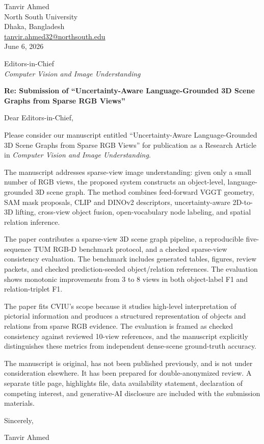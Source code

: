 \documentclass[11pt]{article}
\begin{document}
\begin{flushright}
Tanvir Ahmed\\
North South University\\
Dhaka, Bangladesh\\
\href{mailto:tanvir.ahmed32@northsouth.edu}{tanvir.ahmed32@northsouth.edu}\\
June 6, 2026
\end{flushright}

Editors-in-Chief\\
\emph{Computer Vision and Image Understanding}

\textbf{Re: Submission of ``Uncertainty-Aware Language-Grounded 3D Scene Graphs from Sparse RGB Views''}

Dear Editors-in-Chief,

Please consider our manuscript entitled ``Uncertainty-Aware Language-Grounded 3D Scene Graphs from Sparse RGB Views'' for publication as a Research Article in \emph{Computer Vision and Image Understanding}.

The manuscript addresses sparse-view image understanding: given only a small number of RGB views, the proposed system constructs an object-level, language-grounded 3D scene graph. The method combines feed-forward VGGT geometry, SAM mask proposals, CLIP and DINOv2 descriptors, uncertainty-aware 2D-to-3D lifting, cross-view object fusion, open-vocabulary node labeling, and spatial relation inference.

The paper contributes a sparse-view 3D scene graph pipeline, a reproducible five-sequence TUM RGB-D benchmark protocol, and a checked sparse-view consistency evaluation. The benchmark includes generated tables, figures, review packets, and checked prediction-seeded object/relation references. The evaluation shows monotonic improvements from 3 to 8 views in both object-label F1 and relation-triplet F1.

The paper fits CVIU's scope because it studies high-level interpretation of pictorial information and produces a structured representation of objects and relations from sparse RGB evidence. The evaluation is framed as checked consistency against reviewed 10-view references, and the manuscript explicitly distinguishes these metrics from independent dense-scene ground-truth accuracy.

The manuscript is original, has not been published previously, and is not under consideration elsewhere. It has been prepared for double-anonymized review. A separate title page, highlights file, data availability statement, declaration of competing interest, and generative-AI disclosure are included with the submission materials.

Sincerely,

\vspace{1em}
Tanvir Ahmed
\end{document}
